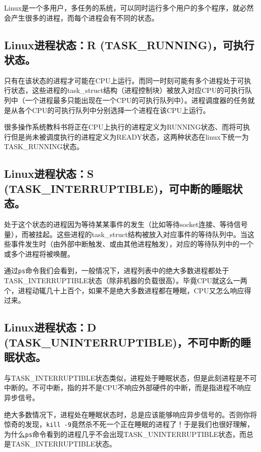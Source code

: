 \documentclass[doctor,openright,twoside]{sjtuthesis}
\newcommand{\passthrough}[1]{#1}
\theoremstyle{plain}
\theoremstyle{definition}
\theoremstyle{remark}
\theoremstyle{ocrenumbox}
\theoremstyle{plain}
\begin{document}
Linux是一个多用户，多任务的系统，可以同时运行多个用户的多个程序，就必然会产生很多的进程，而每个进程会有不同的状态。

\hypertarget{linuxr-task_running}{%
\subsection{Linux进程状态：R
(TASK\_RUNNING)，可执行状态。}\label{linuxr-task_running}}

只有在该状态的进程才可能在CPU上运行。而同一时刻可能有多个进程处于可执行状态，这些进程的task\_struct结构（进程控制块）被放入对应CPU的可执行队列中（一个进程最多只能出现在一个CPU的可执行队列中）。进程调度器的任务就是从各个CPU的可执行队列中分别选择一个进程在该CPU上运行。

很多操作系统教科书将正在CPU上执行的进程定义为RUNNING状态、而将可执行但是尚未被调度执行的进程定义为READY状态，这两种状态在linux下统一为
TASK\_RUNNING状态。

\hypertarget{linuxs-task_interruptible}{%
\subsection{Linux进程状态：S
(TASK\_INTERRUPTIBLE)，可中断的睡眠状态。}\label{linuxs-task_interruptible}}

处于这个状态的进程因为等待某某事件的发生（比如等待socket连接、等待信号量），而被挂起。这些进程的task\_struct结构被放入对应事件的等待队列中。当这些事件发生时（由外部中断触发、或由其他进程触发），对应的等待队列中的一个或多个进程将被唤醒。

通过\passthrough{\lstinline!ps!}命令我们会看到，一般情况下，进程列表中的绝大多数进程都处于TASK\_INTERRUPTIBLE状态（除非机器的负载很高）。毕竟CPU就这么一两个，进程动辄几十上百个，如果不是绝大多数进程都在睡眠，CPU又怎么响应得过来。

\hypertarget{linuxd-task_uninterruptible}{%
\subsection{Linux进程状态：D
(TASK\_UNINTERRUPTIBLE)，不可中断的睡眠状态。}\label{linuxd-task_uninterruptible}}

与TASK\_INTERRUPTIBLE状态类似，进程处于睡眠状态，但是此刻进程是不可中断的。不可中断，指的并不是CPU不响应外部硬件的中断，而是指进程不响应异步信号。

绝大多数情况下，进程处在睡眠状态时，总是应该能够响应异步信号的。否则你将惊奇的发现，\passthrough{\lstinline!kill -9!}竟然杀不死一个正在睡眠的进程了！于是我们也很好理解，为什么\passthrough{\lstinline!ps!}命令看到的进程几乎不会出现TASK\_UNINTERRUPTIBLE状态，而总是TASK\_INTERRUPTIBLE状态。
\end{document}
